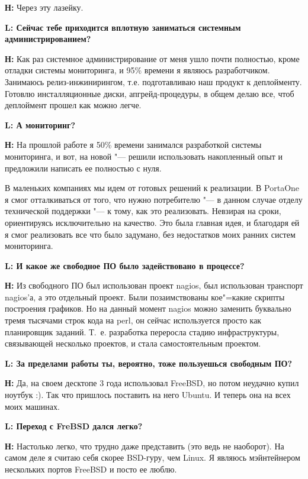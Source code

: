 \documentclass[10pt, a5paper]{article}
\begin{document}
{\noindent \bf Н:} Через эту лазейку.

{\noindent \bf L: Сейчас тебе приходится вплотную заниматься системным администрированием?}

{\noindent \bf Н:} Как раз системное администрирование от меня ушло почти полностью, кроме отладки системы мониторинга, и 95\% времени я являюсь разработчиком. Занимаюсь релиз-инжинирингом, т.е. подготавливаю наш продукт к деплойменту. Готовлю инсталляционные диски, апгрейд-процедуры, в общем делаю все, чтоб деплоймент прошел как можно легче. 

{\noindent \bf L: А мониторинг?}

{\noindent \bf Н:} На прошлой работе я 50\% времени занимался разработкой системы мониторинга, и вот, на новой "--- решили использовать накопленный опыт и предложили написать ее полностью с нуля.

В маленьких компаниях мы идем от готовых решений к реализации. В PortaOne я смог отталкиваться от того, что нужно потребителю "--- в данном случае отделу технической поддержки "--- к тому, как это реализовать. Невзирая на сроки, ориентируясь исключительно на качество. Это была главная идея, и благодаря ей я смог реализовать все что было задумано, без недостатков моих ранних систем мониторинга.

{\noindent \bf L: И какое же свободное ПО было задействовано в процессе?}

{\noindent \bf Н:} Из свободного ПО был использован проект nagios, был использован транспорт nagios'а, а это отдельный проект. Были позаимствованы кое"=какие скрипты построения графиков. Но на данный момент nagios можно заменить буквально тремя тысячами строк кода на perl, он сейчас используется просто как планировщик заданий. Т.~е. разработка переросла стадию инфраструктуры, связывающей несколько проектов, и стала самостоятельным проектом.

{\noindent \bf L: За пределами работы ты, вероятно, тоже пользуешься свободным ПО?}

{\noindent \bf Н:} Да, на своем десктопе 3 года использовал FreeBSD, но потом неудачно купил ноутбук :). Так что пришлось поставить на него Ubuntu. И теперь она на всех моих машинах.

{\noindent \bf L: Переход с FreBSD дался легко?}

{\noindent \bf Н:} Настолько легко, что трудно даже представить (это ведь не наоборот). На самом деле я считаю себя скорее BSD-гуру, чем Linux. Я являюсь мэйнтейнером нескольких портов FreeBSD и посто ее люблю.
\end{document}
